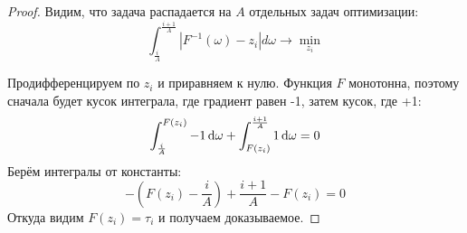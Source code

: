 \begin{theorem}
\begin{proof}
Видим, что задача распадается на $A$ отдельных задач оптимизации:
\begin{equation}\label{w1minim}
\int_{\frac{i}{A}}^{\frac{i + 1}{A}} \left| F^{-1}(\omega) - z_i \right| d\omega \to \min_{z_i}
\end{equation}

Продифференцируем по $z_i$ и приравняем к нулю. Функция $F$ монотонна, поэтому сначала будет кусок интеграла, где градиент равен -1, затем кусок, где +1:
\begin{equation*}
\int_{\frac{i}{A}}^{F(z_i)} -1 \mathop{}\!\mathrm{d} \omega + \int_{F(z_i)}^{\frac{i+1}{A}} 1 \mathop{}\!\mathrm{d} \omega = 0
\end{equation*}
Берём интегралы от константы:
\begin{equation*}
-\left( F(z_i) - \frac{i}{A} \right) + \frac{i+1}{A} - F(z_i) = 0
\end{equation*}
Откуда видим $F(z_i) = \tau_i$ и получаем доказываемое.
\end{proof}
\end{theorem}



